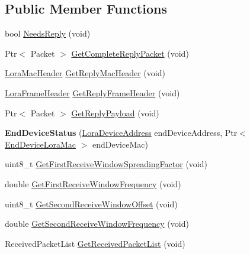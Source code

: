 \subsection*{Public Member Functions}
\begin{DoxyCompactItemize}
\item 
bool \hyperlink{classns3_1_1lorawan_1_1EndDeviceStatus_a25e0c2769696c42a5e62088b2ba0bb2a}{Needs\+Reply} (void)
\item 
Ptr$<$ Packet $>$ \hyperlink{classns3_1_1lorawan_1_1EndDeviceStatus_a816b1769aefdd36fdc06f8f2a5af34f3}{Get\+Complete\+Reply\+Packet} (void)
\item 
\hyperlink{classns3_1_1lorawan_1_1LoraMacHeader}{Lora\+Mac\+Header} \hyperlink{classns3_1_1lorawan_1_1EndDeviceStatus_aec276e89a9a780dce296822f3f7b25b9}{Get\+Reply\+Mac\+Header} (void)
\item 
\hyperlink{classns3_1_1lorawan_1_1LoraFrameHeader}{Lora\+Frame\+Header} \hyperlink{classns3_1_1lorawan_1_1EndDeviceStatus_af2095509552ac48da422cbd14f7e975b}{Get\+Reply\+Frame\+Header} (void)
\item 
Ptr$<$ Packet $>$ \hyperlink{classns3_1_1lorawan_1_1EndDeviceStatus_a718b9f8457df5793a03d9442a4ffed60}{Get\+Reply\+Payload} (void)
\item 
\mbox{\label{classns3_1_1lorawan_1_1EndDeviceStatus_adb0f7234e45ea0051e26c6d8bc323c75}} 
{\bfseries End\+Device\+Status} (\hyperlink{classns3_1_1lorawan_1_1LoraDeviceAddress}{Lora\+Device\+Address} end\+Device\+Address, Ptr$<$ \hyperlink{classns3_1_1lorawan_1_1EndDeviceLoraMac}{End\+Device\+Lora\+Mac} $>$ end\+Device\+Mac)
\item 
uint8\+\_\+t \hyperlink{classns3_1_1lorawan_1_1EndDeviceStatus_aff3f9a544427d61022b526f2a131d614}{Get\+First\+Receive\+Window\+Spreading\+Factor} (void)
\item 
double \hyperlink{classns3_1_1lorawan_1_1EndDeviceStatus_afdb51088fb0af238160ba8bfec7bf0de}{Get\+First\+Receive\+Window\+Frequency} (void)
\item 
uint8\+\_\+t \hyperlink{classns3_1_1lorawan_1_1EndDeviceStatus_a9dc3c9107e16f19ccf96e462c01d1fe3}{Get\+Second\+Receive\+Window\+Offset} (void)
\item 
double \hyperlink{classns3_1_1lorawan_1_1EndDeviceStatus_a29a72fd91a4cd5ea1d4010ba990ec5b6}{Get\+Second\+Receive\+Window\+Frequency} (void)
\item 
Received\+Packet\+List \hyperlink{classns3_1_1lorawan_1_1EndDeviceStatus_af0ea395ca783b6bd3d55fc8f5cba704d}{Get\+Received\+Packet\+List} (void)

\end{DoxyCompactItemize}
